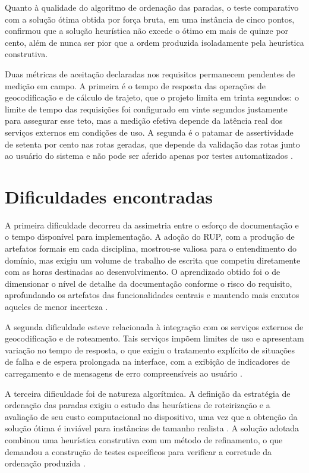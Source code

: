 Quanto à qualidade do algoritmo de ordenação das paradas, o teste comparativo com a solução ótima obtida por força bruta, em uma instância de cinco pontos, confirmou que a solução heurística não excede o ótimo em mais de quinze por cento, além de nunca ser pior que a ordem produzida isoladamente pela heurística construtiva.

Duas métricas de aceitação declaradas nos requisitos permanecem pendentes de medição em campo. A primeira é o tempo de resposta das operações de geocodificação e de cálculo de trajeto, que o projeto limita em trinta segundos: o limite de tempo das requisições foi configurado em vinte segundos justamente para assegurar esse teto, mas a medição efetiva depende da latência real dos serviços externos em condições de uso. A segunda é o patamar de assertividade de setenta por cento nas rotas geradas, que depende da validação das rotas junto ao usuário do sistema e não pode ser aferido apenas por testes automatizados \cite{sriEspecComp2025, sriPedido2025}.

\section{Dificuldades encontradas}

A primeira dificuldade decorreu da assimetria entre o esforço de documentação e o tempo disponível para implementação. A adoção do RUP, com a produção de artefatos formais em cada disciplina, mostrou-se valiosa para o entendimento do domínio, mas exigiu um volume de trabalho de escrita que competiu diretamente com as horas destinadas ao desenvolvimento. O aprendizado obtido foi o de dimensionar o nível de detalhe da documentação conforme o risco do requisito, aprofundando os artefatos das funcionalidades centrais e mantendo mais enxutos aqueles de menor incerteza \cite{kruchten2003}.

A segunda dificuldade esteve relacionada à integração com os serviços externos de geocodificação e de roteamento. Tais serviços impõem limites de uso e apresentam variação no tempo de resposta, o que exigiu o tratamento explícito de situações de falha e de espera prolongada na interface, com a exibição de indicadores de carregamento e de mensagens de erro compreensíveis ao usuário \cite{nominatim2024, osrm2024}.

A terceira dificuldade foi de natureza algorítmica. A definição da estratégia de ordenação das paradas exigiu o estudo das heurísticas de roteirização e a avaliação de seu custo computacional no dispositivo, uma vez que a obtenção da solução ótima é inviável para instâncias de tamanho realista \cite{cunha2000}. A solução adotada combinou uma heurística construtiva com um método de refinamento, o que demandou a construção de testes específicos para verificar a corretude da ordenação produzida \cite{croes1958}.

